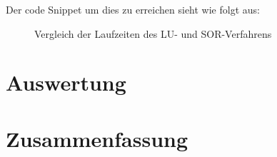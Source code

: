 \documentclass{scrartcl}
\begin{document}
Der code Snippet um dies zu erreichen sieht wie folgt aus:


\begin{figure}[H]
    \centering
    \caption{Vergleich der Laufzeiten des LU- und SOR-Verfahrens}
    \label{fig:runtime-comparison}
\end{figure}

\section{Auswertung}


\section{Zusammenfassung}


\printbibliography%
\end{document}
